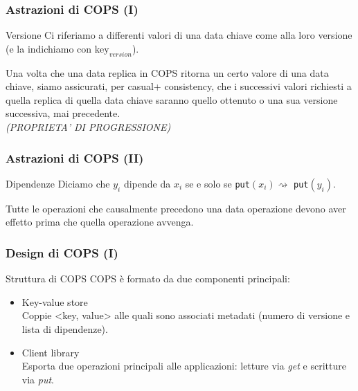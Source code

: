 \begin{frame}
\frametitle{Astrazioni di COPS (I)}
\begin{block}{Versione}
Ci riferiamo a differenti valori di una data chiave come alla loro \alert{versione}
(e la indichiamo con $\text{key}_{version}$).
\end{block}
Una volta che una data replica in COPS ritorna un certo valore di una data chiave,
siamo assicurati, per casual+ consistency, che i successivi valori richiesti a quella
replica di quella data chiave saranno quello ottenuto o una sua versione successiva,
mai precedente.\\
\textit{(PROPRIETA' DI PROGRESSIONE)}
\end{frame}

\begin{frame}
\frametitle{Astrazioni di COPS (II)}
\begin{block}{Dipendenze}
Diciamo che $y_i$ \alert{dipende da} $x_i$ se e solo se \texttt{put}$(x_i)
\rightsquigarrow$ \texttt{put}$(y_i)$.
\end{block}
Tutte le operazioni che causalmente precedono una data operazione devono aver effetto
prima che quella operazione avvenga.
\end{frame}

\begin{frame}
\frametitle{Design di COPS (I)}
\begin{block}{Struttura di COPS}
COPS è formato da due componenti principali:
\begin{itemize}
	\item<1-> Key-value store \\
			  Coppie <key, value> alle quali sono associati metadati (numero di versione
			  e lista di dipendenze).
	\item<1-> Client library \\
			  Esporta due operazioni principali alle applicazioni: letture via \textit{get}
			  e scritture via \textit{put}.
\end{itemize}
\end{block}
\end{frame}

